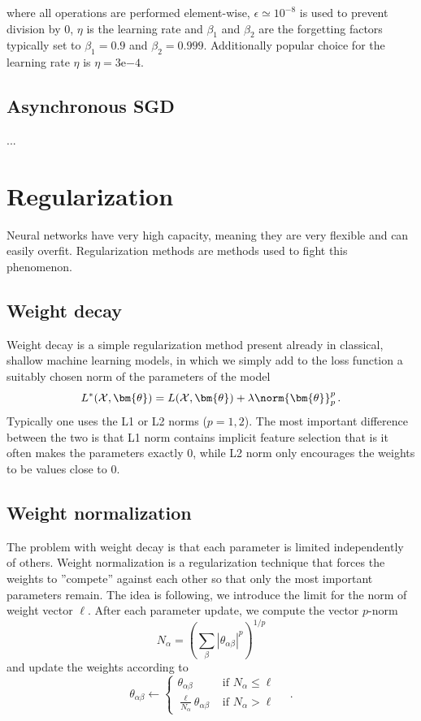 \documentclass[a5paper]{article}
\newcommand{\mc}[1]{\mathcal{#1}}
\begin{document}
where all operations are performed element-wise, \(\epsilon \simeq 10^{-8}\) is used to prevent
division by 0, \(\eta\) is the learning rate and \(\beta_1\) and \(\beta_2\) are the forgetting
factors typically set to \(\beta_1=0.9\) and \(\beta_2=0.999\). Additionally popular choice for the
learning rate \(\eta\) is \(\eta = 3\mathrm{e}{-4}\).


\subsection{Asynchronous SGD}

...


\section{Regularization}

Neural networks have very high capacity, meaning they are very flexible and can easily overfit.
Regularization methods are methods used to fight this phenomenon.


\subsection{Weight decay}

Weight decay is a simple regularization method present already in classical, shallow machine
learning models, in which we simply add to the loss function a suitably chosen norm of the
parameters of the model
\[
   L^*(\mc{X}, \bm{\theta}) = L(\mc{X}, \bm{\theta}) + \lambda \norm{\bm{\theta}}_p^p\,.
\]
Typically one uses the L1 or L2 norms (\(p=1,2\)). The most important difference between the two is
that L1 norm contains implicit feature selection that is it often makes the parameters exactly 0,
while L2 norm only encourages the weights to be values close to 0. 


\subsection{Weight normalization}

The problem with weight decay is that each parameter is limited independently of others. Weight
normalization is a regularization technique that forces the weights to ''compete'' against each
other so that only the most important parameters remain. The idea is following, we introduce the
limit for the norm of weight vector \(\ell\). After each parameter update, we compute the vector
\(p\)-norm
\[
   N_{\alpha} = \left( \sum_{\beta} \left|\theta_{\alpha\beta}\right|^p \right)^{1/p}
\]
and update the weights according to
\[
   \theta_{\alpha\beta} \gets \begin{cases} 
                           \theta_{\alpha\beta}                            &\text{ if \(N_\alpha \leq \ell\)}\\
                           \frac{\ell}{N_\alpha} \theta_{\alpha\beta}   &\text{ if \(N_\alpha > \ell\)}
   \end{cases}\quad.
\]
\end{document}
